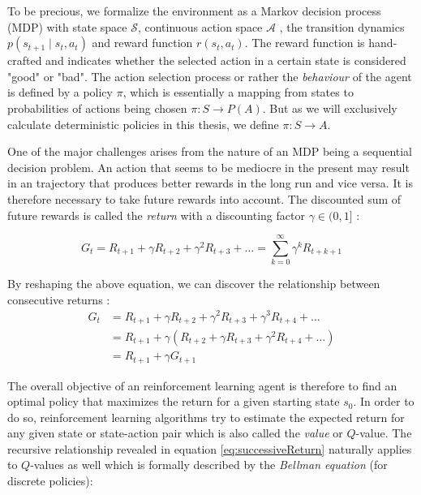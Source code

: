 To be precious, we formalize the environment as a Markov decision process (MDP) with state space $\mathcal{S}$, continuous action space $\mathcal{A}$ , the transition dynamics $p(s_{t+1} \mid s_t, a_t)$ and reward function $r(s_t, a_t)$. The reward function is hand-crafted and indicates whether the selected action in a certain state is considered "good" or "bad". The action selection process or rather the \textit{behaviour} of the agent is defined by a policy $\pi$, which is essentially a mapping from states to probabilities of actions being chosen $\pi: S \rightarrow P(A)$. But as we will exclusively calculate deterministic policies in this thesis, we define $\pi: S \rightarrow A$.
\par 
One of the major challenges arises from the nature of an MDP being a sequential decision problem. An action that seems to be mediocre in the present may result in an trajectory that produces better rewards in the long run and vice versa. It is therefore necessary to take future rewards into account. The discounted sum of future rewards is called the \textit{return} with a discounting factor $\gamma \in (0,1]$  \cite[p.55]{Sutton1998}:

\begin{equation}\label{eq:discountedReturn}
    G_t = R_{t+1} + \gamma R_{t+2} + \gamma^2 R_{t+3} + \dots  = \sum_{k=0}^\infty{\gamma^k R_{t+k+1}}
\end{equation}

By reshaping the above equation, we can discover the relationship between consecutive returns \cite[p.55]{Sutton1998}:
\begin{equation}\label{eq:successiveReturn}
    \begin{aligned}
    G_t &= R_{t+1} + \gamma R_{t+2} + \gamma^2 R_{t+3} + \gamma^3 R_{t+4} + \dots \\
    &= R_{t+1} + \gamma (R_{t+2} + \gamma R_{t+3} + \gamma^2 R_{t+4} + \dots)  \\
   & = R_{t+1} + \gamma G_{t+1}
    \end{aligned}
\end{equation}

The overall objective of an reinforcement learning agent is therefore to find an optimal policy that maximizes the return for a given starting state $s_0$. In order to do so, reinforcement learning algorithms try to estimate the expected return for any given state or state-action pair which is also called the \textit{value} or $Q$-value. The recursive relationship revealed in equation \ref{eq:successiveReturn} naturally applies to $Q$-values as well which is formally described by the \textit{Bellman equation} (for discrete policies):

